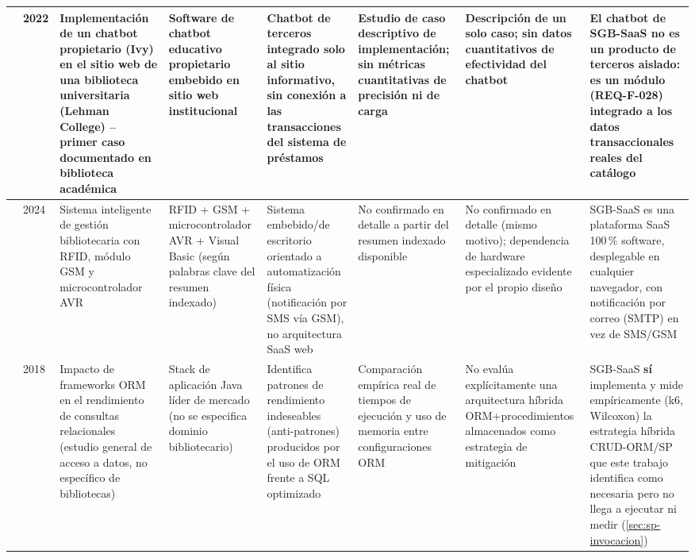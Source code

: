 \begin{landscape}
\begin{center}
\begin{longtable}{|p{2.0cm}|p{0.8cm}|p{2.5cm}|p{2.5cm}|p{2.8cm}|p{3.0cm}|p{2.8cm}|p{3.0cm}|}
\citet{ehrenpreis2022chatbot} & 2022 &
Implementación de un chatbot propietario (Ivy) en el sitio web de una
biblioteca universitaria (Lehman College) -- primer caso documentado en
biblioteca académica &
Software de chatbot educativo propietario embebido en sitio web
institucional &
Chatbot de terceros integrado solo al sitio informativo, sin conexión a
las transacciones del sistema de préstamos &
Estudio de caso descriptivo de implementación; sin métricas
cuantitativas de precisión ni de carga &
Descripción de un solo caso; sin datos cuantitativos de efectividad del
chatbot &
El chatbot de SGB-SaaS no es un producto de terceros aislado: es un
módulo (REQ-F-028) integrado a los datos transaccionales reales del
catálogo \\
\hline

\citet{shivaji2024intelligentlms} & 2024 &
Sistema inteligente de gestión bibliotecaria con RFID, módulo GSM y
microcontrolador AVR &
RFID + GSM + microcontrolador AVR + Visual Basic (según palabras clave
del resumen indexado) &
Sistema embebido/de escritorio orientado a automatización física
(notificación por SMS vía GSM), no arquitectura SaaS web &
No confirmado en detalle a partir del resumen indexado disponible &
No confirmado en detalle (mismo motivo); dependencia de hardware
especializado evidente por el propio diseño &
SGB-SaaS es una plataforma SaaS 100\,\% software, desplegable en
cualquier navegador, con notificación por correo (SMTP) en vez de
SMS/GSM \\
\hline

\citet{colley2018ormperformance} & 2018 &
Impacto de frameworks ORM en el rendimiento de consultas relacionales
(estudio general de acceso a datos, no específico de bibliotecas) &
Stack de aplicación Java líder de mercado (no se especifica dominio
bibliotecario) &
Identifica patrones de rendimiento indeseables (anti-patrones)
producidos por el uso de ORM frente a SQL optimizado &
Comparación empírica real de tiempos de ejecución y uso de memoria entre
configuraciones ORM &
No evalúa explícitamente una arquitectura híbrida ORM+procedimientos
almacenados como estrategia de mitigación &
SGB-SaaS \textbf{sí} implementa y mide empíricamente (k6, Wilcoxon) la
estrategia híbrida CRUD-ORM/SP que este trabajo identifica como
necesaria pero no llega a ejecutar ni medir (\autoref{sec:sp-invocacion}) \\
\hline


\end{longtable}
\end{center}
\end{landscape}
